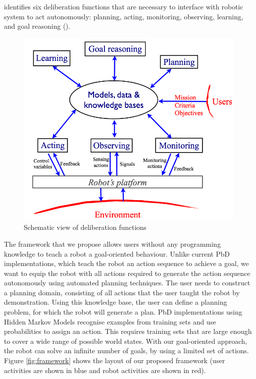 \cite{ingrand2017deliberation} identifies six deliberation functions that are necessary to interface with robotic system to act autonomously: planning, acting, monitoring, observing, learning, and goal reasoning ().

\begin{figure}[h]
	\centering
	\includegraphics[scale=0.50]{figures/deliberationfunctions}
	\caption{Schematic view of deliberation functions \cite{ingrand2017deliberation}}
	\label{fig:deliberationfunctions}
\end{figure}

The framework that we propose allows users without any programming knowledge to teach a robot a goal-oriented behaviour. 
Unlike current PbD implementations, which teach the robot an action sequence to achieve a goal, we want to equip the robot with all actions required to generate the action sequence autonomously using automated planning techniques. The user needs to construct a planning domain, consisting of all actions that the user taught the robot by demonstration.
 Using this knowledge base, the user can define a planning problem, for which the robot will generate a plan.
 PbD implementations using Hidden Markov Models recognise examples from training sets and use probabilities to assign an action.
 This requires training sets that are large enough to cover a wide range of possible world states.
 With our goal-oriented approach, the robot can solve an infinite number of goals, by using a limited set of actions.
 Figure \ref{fig:framework} shows the layout of our proposed framework (user activities are shown in blue and robot activities are shown in red).
 

